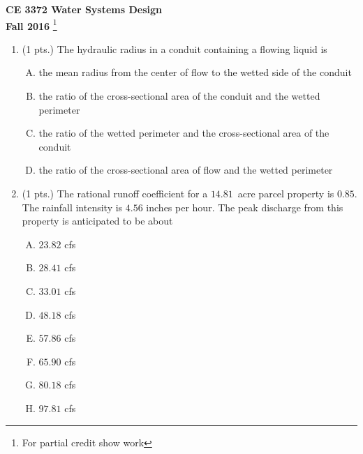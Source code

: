 \documentclass[11pt]{article}
\begin{document}
\begingroup
\begin{center}
{\textbf{{ CE 3372 Water Systems Design}  \\ Fall 2016} \footnote{For partial credit show work}
}
\end{center}
\endgroup


\begin{enumerate}
\item  (1 pts.) The hydraulic radius in a conduit containing a flowing liquid is
\begin{enumerate} [(A)]
\item	the mean radius from the center of flow to the wetted side of the conduit
\item	the ratio of the cross-sectional area of the conduit and the wetted perimeter
\item	the ratio of the wetted perimeter and the cross-sectional area of the conduit
\item	the ratio of the cross-sectional area of flow and the wetted perimeter
\end{enumerate}
\item (1 pts.)
The rational runoff coefficient for a $14.81$~acre parcel property is $0.85$.  
The rainfall intensity is $4.56$ inches per hour.  
The peak discharge from this property is anticipated to be about
\begin{enumerate} [(A)]
\item $23.82$ cfs
\item $28.41$ cfs
\item $33.01$ cfs
\item $48.18$ cfs
\item $57.86$ cfs
\item $65.90$ cfs
\item $80.18$ cfs
\item $97.81$ cfs
\end{enumerate}

\end{enumerate}
\end{document}
